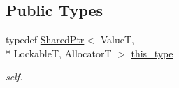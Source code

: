 \subsection*{Public Types}
\begin{DoxyCompactItemize}
\item 
\hypertarget{classhryky_1_1_shared_ptr_a0fa551b79990485506c88137044ec4b8}{typedef \hyperlink{classhryky_1_1_shared_ptr}{Shared\-Ptr}$<$ Value\-T, \\*
Lockable\-T, Allocator\-T $>$ \hyperlink{classhryky_1_1_shared_ptr_a0fa551b79990485506c88137044ec4b8}{this\-\_\-type}}\label{classhryky_1_1_shared_ptr_a0fa551b79990485506c88137044ec4b8}

\begin{DoxyCompactList}\small\item\em self. \end{DoxyCompactList}\end{DoxyCompactItemize}
